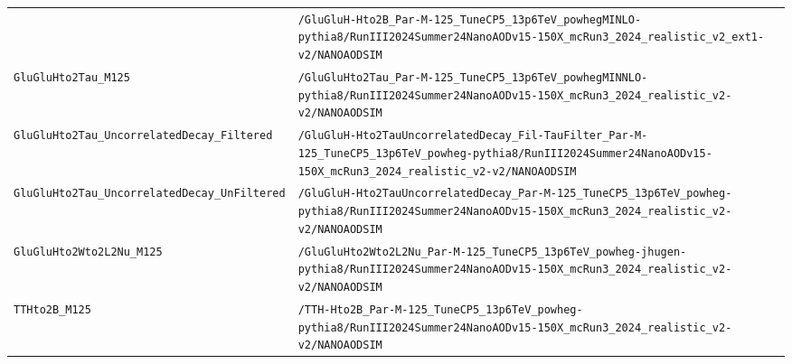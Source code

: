 \begin{longtable}{@{}>{\RaggedRight\arraybackslash}p{} >{\RaggedRight\arraybackslash}p{}@{}}
 & \texttt{/\allowbreak{}GluGluH-\allowbreak{}Hto2B\_\allowbreak{}Par-\allowbreak{}M-\allowbreak{}125\_\allowbreak{}TuneCP5\_\allowbreak{}13p6TeV\_\allowbreak{}powhegMINLO-\allowbreak{}pythia8/\allowbreak{}RunIII2024Summer24NanoAODv15-\allowbreak{}150X\_\allowbreak{}mcRun3\_\allowbreak{}2024\_\allowbreak{}realistic\_\allowbreak{}v2\_\allowbreak{}ext1-\allowbreak{}v2/\allowbreak{}NANOAODSIM} \\
\addlinespace[2pt]
\texttt{GluGluHto2Tau\_\allowbreak{}M125} & \texttt{/\allowbreak{}GluGluHto2Tau\_\allowbreak{}Par-\allowbreak{}M-\allowbreak{}125\_\allowbreak{}TuneCP5\_\allowbreak{}13p6TeV\_\allowbreak{}powhegMINNLO-\allowbreak{}pythia8/\allowbreak{}RunIII2024Summer24NanoAODv15-\allowbreak{}150X\_\allowbreak{}mcRun3\_\allowbreak{}2024\_\allowbreak{}realistic\_\allowbreak{}v2-\allowbreak{}v2/\allowbreak{}NANOAODSIM} \\
\addlinespace[2pt]
\texttt{GluGluHto2Tau\_\allowbreak{}UncorrelatedDecay\_\allowbreak{}Filtered} & \texttt{/\allowbreak{}GluGluH-\allowbreak{}Hto2TauUncorrelatedDecay\_\allowbreak{}Fil-\allowbreak{}TauFilter\_\allowbreak{}Par-\allowbreak{}M-\allowbreak{}125\_\allowbreak{}TuneCP5\_\allowbreak{}13p6TeV\_\allowbreak{}powheg-\allowbreak{}pythia8/\allowbreak{}RunIII2024Summer24NanoAODv15-\allowbreak{}150X\_\allowbreak{}mcRun3\_\allowbreak{}2024\_\allowbreak{}realistic\_\allowbreak{}v2-\allowbreak{}v2/\allowbreak{}NANOAODSIM} \\
\addlinespace[2pt]
\texttt{GluGluHto2Tau\_\allowbreak{}UncorrelatedDecay\_\allowbreak{}UnFiltered} & \texttt{/\allowbreak{}GluGluH-\allowbreak{}Hto2TauUncorrelatedDecay\_\allowbreak{}Par-\allowbreak{}M-\allowbreak{}125\_\allowbreak{}TuneCP5\_\allowbreak{}13p6TeV\_\allowbreak{}powheg-\allowbreak{}pythia8/\allowbreak{}RunIII2024Summer24NanoAODv15-\allowbreak{}150X\_\allowbreak{}mcRun3\_\allowbreak{}2024\_\allowbreak{}realistic\_\allowbreak{}v2-\allowbreak{}v2/\allowbreak{}NANOAODSIM} \\
\addlinespace[2pt]
\texttt{GluGluHto2Wto2L2Nu\_\allowbreak{}M125} & \texttt{/\allowbreak{}GluGluHto2Wto2L2Nu\_\allowbreak{}Par-\allowbreak{}M-\allowbreak{}125\_\allowbreak{}TuneCP5\_\allowbreak{}13p6TeV\_\allowbreak{}powheg-\allowbreak{}jhugen-\allowbreak{}pythia8/\allowbreak{}RunIII2024Summer24NanoAODv15-\allowbreak{}150X\_\allowbreak{}mcRun3\_\allowbreak{}2024\_\allowbreak{}realistic\_\allowbreak{}v2-\allowbreak{}v2/\allowbreak{}NANOAODSIM} \\
\addlinespace[2pt]
\texttt{TTHto2B\_\allowbreak{}M125} & \texttt{/\allowbreak{}TTH-\allowbreak{}Hto2B\_\allowbreak{}Par-\allowbreak{}M-\allowbreak{}125\_\allowbreak{}TuneCP5\_\allowbreak{}13p6TeV\_\allowbreak{}powheg-\allowbreak{}pythia8/\allowbreak{}RunIII2024Summer24NanoAODv15-\allowbreak{}150X\_\allowbreak{}mcRun3\_\allowbreak{}2024\_\allowbreak{}realistic\_\allowbreak{}v2-\allowbreak{}v2/\allowbreak{}NANOAODSIM} \\

\end{longtable}

